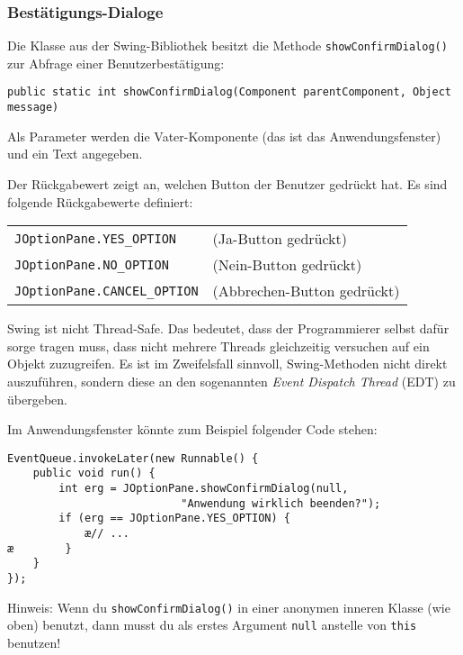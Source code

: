 \subsubsection{Bestätigungs-Dialoge}

Die Klasse  aus der Swing-Bibliothek besitzt die Methode
\lstinline|showConfirmDialog()| zur Abfrage einer Benutzerbestätigung:

\begin{lstlisting}
public static int showConfirmDialog(Component parentComponent, Object message)
\end{lstlisting}

Als Parameter werden die Vater-Komponente (das ist das Anwendungsfenster) und
ein Text angegeben.

Der Rückgabewert zeigt an, welchen Button der Benutzer gedrückt hat. Es sind
folgende Rückgabewerte definiert:

\bgroup
\def\arraystretch{1.2}
\begin{tabular}{ll}
\lstinline|JOptionPane.YES_OPTION| \hspace{15mm} &
(Ja-Button gedrückt)
\\
\lstinline|JOptionPane.NO_OPTION| \hspace{15mm} &
(Nein-Button gedrückt)
\\
\lstinline|JOptionPane.CANCEL_OPTION| \hspace{15mm} &
(Abbrechen-Button gedrückt)
\\
\end{tabular}
\egroup

Swing ist nicht Thread-Safe. Das bedeutet, dass der Programmierer selbst dafür
sorge tragen muss, dass nicht mehrere Threads gleichzeitig versuchen auf ein
Objekt zuzugreifen. Es ist im Zweifelsfall sinnvoll, Swing-Methoden nicht
direkt auszuführen, sondern diese an den sogenannten \emph{Event Dispatch
Thread} (EDT) zu übergeben.

Im Anwendungsfenster könnte zum Beispiel folgender Code stehen:

\begin{lstlisting}
EventQueue.invokeLater(new Runnable() {
    public void run() {
        int erg = JOptionPane.showConfirmDialog(null, 
                           "Anwendung wirklich beenden?");
        if (erg == JOptionPane.YES_OPTION) {
            æ// ...
æ        }
    }
});
\end{lstlisting}

Hinweis: Wenn du \lstinline|showConfirmDialog()| in einer anonymen inneren
Klasse (wie oben) benutzt, dann musst du als erstes Argument \lstinline|null|
anstelle von \lstinline|this| benutzen!


